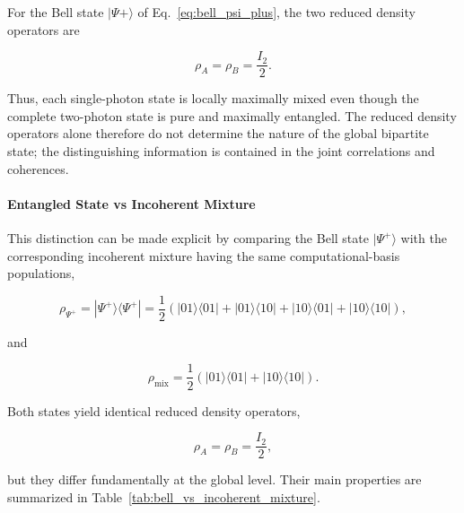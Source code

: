 For the Bell state \(|\Psi+\rangle\) of Eq.~\eqref{eq:bell_psi_plus}, the two reduced density
operators are

\begin{equation}
\rho_A
=
\rho_B
=
\frac{I_2}{2}.
\label{eq:bell_reduced_states}
\end{equation}

Thus, each single-photon state is locally maximally mixed even though the complete
two-photon state is pure and maximally entangled. The reduced density operators
alone therefore do not determine the nature of the global bipartite state; the
distinguishing information is contained in the joint correlations and coherences.

\paragraph{Entangled State vs Incoherent Mixture}

This distinction can be made explicit by comparing the Bell state
\(|\Psi^+\rangle\) with the corresponding incoherent mixture having the same
computational-basis populations,

\begin{equation}
\rho_{\Psi^+}
=
|\Psi^+\rangle\langle\Psi^+|
=
\frac{1}{2}
\left(
|01\rangle\langle01|
+
|01\rangle\langle10|
+
|10\rangle\langle01|
+
|10\rangle\langle10|
\right),
\end{equation}

and

\begin{equation}
\rho_{\mathrm{mix}}
=
\frac{1}{2}
\left(
|01\rangle\langle01|
+
|10\rangle\langle10|
\right).
\end{equation}

Both states yield identical reduced density operators,

\begin{equation}
\rho_A=\rho_B=\frac{I_2}{2},
\end{equation}

but they differ fundamentally at the global level. Their main properties are
summarized in Table~\ref{tab:bell_vs_incoherent_mixture}.

